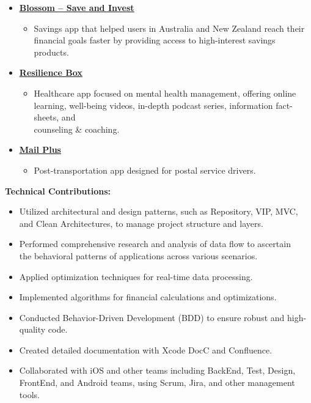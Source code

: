 \documentclass[letter,12pt]{article}
\newcommand{\customsquare}{\raisebox{0.25ex}{\scalebox{0.45}{$\blacksquare$}}}
\begin{document}
\begin{itemize}[label={\customsquare}]
    \item \href{https://www.blossomapp.com}{\underline{\textbf{Blossom -- Save and Invest}}}
    \begin{itemize}
        \item Savings app that helped users in Australia and New Zealand reach their \mbox{financial} goals faster by providing access to high-interest savings products.
    \end{itemize}
    
    \item \href{https://app.resiliencebox.com}{\underline{\textbf{Resilience Box}}}
    \begin{itemize}
        \item Healthcare app focused on mental health management, offering online \mbox{learning}, well-being videos, in-depth podcast series, information fact-sheets, and \\ counseling \& coaching.
    \end{itemize}

    \item \href{https://mailplus.com.au}{\underline{\textbf{Mail Plus}}}
    \begin{itemize}
        \item Post-transportation app designed for postal service drivers.
    \end{itemize}
\end{itemize}

\textbf{Technical Contributions:}
\begin{itemize}[label={\customsquare}]
    \item Utilized architectural and design patterns, such as Repository, VIP, MVC, and Clean Architectures, to manage project structure and layers.
    \item Performed comprehensive research and analysis of data flow to ascertain \\ the behavioral patterns of applications across various scenarios.
    \item Applied optimization techniques for real-time data processing.
    \item Implemented algorithms for financial calculations and optimizations.
    \item Conducted Behavior-Driven Development (BDD) to ensure robust and high-quality code.
    \item Created detailed documentation with Xcode DocC and Confluence.
    \item Collaborated with iOS and other teams including BackEnd, Test, Design, FrontEnd, and Android teams, using Scrum, Jira, and other management tools.
\end{itemize}
\end{document}
